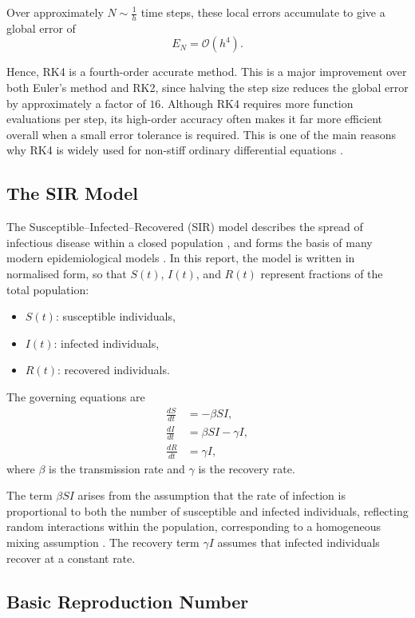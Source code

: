 \documentclass{article}
\begin{document}
Over approximately $N \sim \frac{1}{h}$ time steps, these local errors accumulate to give a global error of
\begin{equation}
E_N = \mathcal{O}(h^4).
\end{equation}

Hence, RK4 is a fourth-order accurate method. This is a major improvement over both Euler’s method and RK2, since halving the step size reduces the global error by approximately a factor of $16$. Although RK4 requires more function evaluations per step, its high-order accuracy often makes it far more efficient overall when a small error tolerance is required. This is one of the main reasons why RK4 is widely used for non-stiff ordinary differential equations \cite{12}.

\subsection{The SIR Model}

The Susceptible--Infected--Recovered (SIR) model describes the spread of infectious disease within a closed population \cite{6}, and forms the basis of many modern epidemiological models \cite{15}. In this report, the model is written in normalised form, so that $S(t)$, $I(t)$, and $R(t)$ represent fractions of the total population:
\begin{itemize}
    \item $S(t)$: susceptible individuals,
    \item $I(t)$: infected individuals,
    \item $R(t)$: recovered individuals.
\end{itemize}

The governing equations are
\begin{align}
\frac{dS}{dt} &= -\beta S I, \\
\frac{dI}{dt} &= \beta S I - \gamma I, \\
\frac{dR}{dt} &= \gamma I,
\end{align}
where $\beta$ is the transmission rate and $\gamma$ is the recovery rate.

The term $\beta S I$ arises from the assumption that the rate of infection is proportional to both the number of susceptible and infected individuals, reflecting random interactions within the population, corresponding to a homogeneous mixing assumption \cite{7}. The recovery term $\gamma I$ assumes that infected individuals recover at a constant rate.

\subsection{Basic Reproduction Number}
\end{document}
